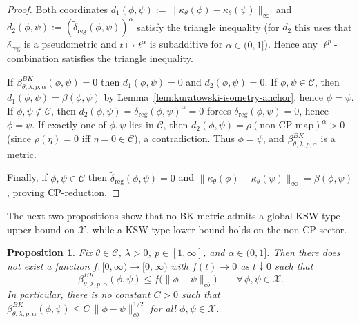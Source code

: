 \documentclass[11pt]{amsart}
\newtheorem{proposition}[theorem]{Proposition}
\theoremstyle{definition}
\theoremstyle{remark}
\newcommand{\1}{\mathbbm{1}}
\begin{document}
\begin{proof}
Both coordinates $d_1(\phi,\psi):=\|\kappa_\theta(\phi)-\kappa_\theta(\psi)\|_\infty$ and
$d_2(\phi,\psi):=(\widetilde\delta_{\mathrm{reg}}(\phi,\psi))^\alpha$
satisfy the triangle inequality (for $d_2$ this uses that $\widetilde\delta_{\mathrm{reg}}$ is a pseudometric and $t\mapsto t^\alpha$ is subadditive for $\alpha\in(0,1]$).
Hence any $\ell^p$-combination satisfies the triangle inequality.

If $\beta^{BK}_{\theta,\lambda,p,\alpha}(\phi,\psi)=0$ then $d_1(\phi,\psi)=0$ and $d_2(\phi,\psi)=0$.
If $\phi,\psi\in \mathcal C$, then $d_1(\phi,\psi)=\beta(\phi,\psi)$ by Lemma~\ref{lem:kuratowski-isometry-anchor}, hence $\phi=\psi$.
If $\phi,\psi\notin \mathcal C$, then $d_2(\phi,\psi)=\delta_{\mathrm{reg}}(\phi,\psi)^\alpha=0$ forces $\delta_{\mathrm{reg}}(\phi,\psi)=0$, hence $\phi=\psi$.
If exactly one of $\phi,\psi$ lies in $\mathcal C$, then $d_2(\phi,\psi)=\rho(\text{non-CP map})^\alpha>0$ (since $\rho(\eta)=0$ iff $\eta=0\in\mathcal C$), a contradiction.
Thus $\phi=\psi$, and $\beta^{BK}_{\theta,\lambda,p,\alpha}$ is a metric.

Finally, if $\phi,\psi\in \mathcal C$ then $\widetilde\delta_{\mathrm{reg}}(\phi,\psi)=0$ and
$\|\kappa_\theta(\phi)-\kappa_\theta(\psi)\|_\infty=\beta(\phi,\psi)$, proving CP-reduction.
\end{proof}

The next two propositions show that no BK metric admits a global KSW-type upper bound on $\mathcal X$, while a KSW-type lower bound holds on the non-CP sector.

\begin{proposition}
\label{prop:no-upper-KSW}
Fix $\theta\in \mathcal C$, $\lambda>0$, $p\in[1,\infty]$, and $\alpha\in(0,1]$.
Then there does not exist a function $f:[0,\infty)\to[0,\infty)$ with $f(t)\to 0$ as $t\downarrow 0$
 such that
\[
\beta^{BK}_{\theta,\lambda,p,\alpha}(\phi,\psi)\le f\bigl(\|\phi-\psi\|_{cb}\bigr)
\qquad\forall\, \phi,\psi\in \mathcal X.
\]
In particular, there is no constant $C>0$ such that $\beta^{BK}_{\theta,\lambda,p,\alpha}(\phi,\psi)\le C\,\|\phi-\psi\|_{cb}^{1/2}$
for all $\phi,\psi\in \mathcal X$.
\end{proposition}
\end{document}
